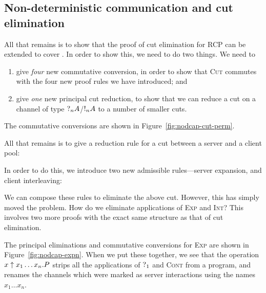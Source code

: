 \documentclass[a4paper,UKenglish]{lipics-v2016}
\begin{document}
\subsection*{Non-deterministic communication and cut elimination}
All that remains is to show that the proof of cut elimination for RCP can be
extended to cover \nodcap. In order to show this, we need to do two things.
We need to
\begin{enumerate}
\item
  give \emph{four} new commutative conversion, in order to show that
  \textsc{Cut} commutes with the four new proof rules we have introduced; and
\item
  give \emph{one} new principal cut reduction, to show that we can reduce a cut
  on a channel of type $\give[n]{A}$/$\take[n]{A}$ to a number of smaller cuts.
\end{enumerate}
The commutative conversions are shown in Figure~\ref{fig:nodcap-cut-perm}.
%

%
All that remains is to give a reduction rule for a cut between a server and a
client pool:  
\begin{prooftree}
\end{prooftree}
In order to do this, we introduce two new admissible rules---server expansion,
and client interleaving:
\begin{center}
  \begin{scprooftree*}[0.90]
  \end{scprooftree*}%
  \begin{scprooftree*}[0.90]
  \end{scprooftree*}
\end{center}
We can compose these rules to eliminate the above cut. However, this has simply
moved the problem. How do we eliminate applications of \textsc{Exp} and
\textsc{Int}? This involves two more proofs with the exact same structure as
that of cut elimination.

The principal eliminations and commutative conversions for \textsc{Exp} are
shown in Figure~\ref{fig:nodcap-expn}. When we put these together, we see that
the operation $\expn{x}{x_1 \dots x_n}P$ strips all the applications of
$\give[1]{}$ and \textsc{Cont} from a program, and renames the channels which
were marked as server interactions using the names $x_1 \dots x_n$.
% 

\end{document}
